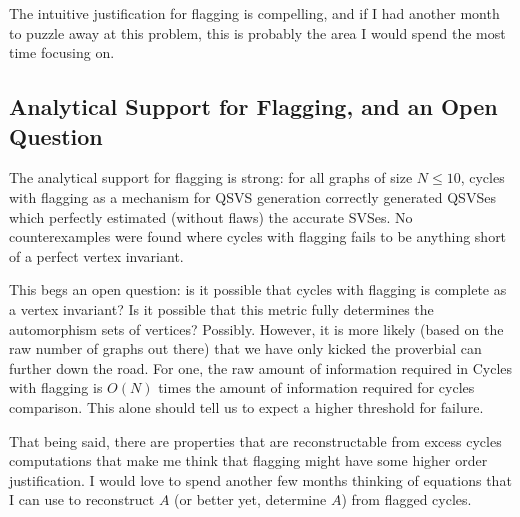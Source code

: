 The intuitive justification for flagging is compelling, and if I had another month to puzzle away at this problem, this is probably the area I would spend the most time focusing on.

\subsection{Analytical Support for Flagging, and an Open Question}

The analytical support for flagging is strong:
for all graphs of size $N \leq 10$, cycles with flagging as a mechanism for QSVS generation correctly generated QSVSes which perfectly estimated (without flaws) the accurate SVSes.
No counterexamples were found where cycles with flagging fails to be anything short of a perfect vertex invariant.

This begs an open question: is it possible that cycles with flagging is complete as a vertex invariant?
Is it possible that this metric fully determines the automorphism sets of vertices? Possibly.
However, it is more likely (based on the raw number of graphs out there) that we have only kicked the proverbial can further down the road.
For one, the raw amount of information required in Cycles with flagging is $O(N)$ times the amount of information required for cycles comparison.
This alone should tell us to expect a higher threshold for failure.

That being said, there are properties that are reconstructable from excess cycles computations that make me think that flagging might have some higher order justification.
I would love to spend another few months thinking of equations that I can use to reconstruct $A$ (or better yet, determine $A$) from flagged cycles.

